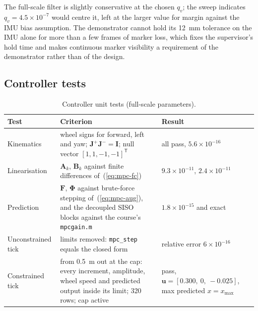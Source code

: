 \documentclass[11pt,a4paper]{article}
\newcommand{\vect}[1]{\bm{#1}}
\newcommand{\mat}[1]{\bm{#1}}
\newcommand{\T}{^{\mathsf{T}}}
\begin{document}
The full-scale filter is slightly conservative at the chosen $q_v$; the sweep indicates $q_v = 4.5\times10^{-7}$ would centre it, left at the larger value for margin against the IMU bias assumption. The demonstrator cannot hold its 12~mm tolerance on the IMU alone for more than a few frames of marker loss, which fixes the supervisor's hold time and makes continuous marker visibility a requirement of the demonstrator rather than of the design.

\subsection{Controller tests}
\begin{table}[H]
\centering\small
\caption{Controller unit tests (full-scale parameters).}
\label{tab:mpc-tests}
\begin{tabularx}{\linewidth}{>{\raggedright\arraybackslash}p{3.4cm} X >{\raggedright\arraybackslash}p{4.6cm}}
\toprule
Test & Criterion & Result \\
\midrule
Kinematics & wheel signs for forward, left and yaw; $\mat J^{+}\mat J^{-} = \mat I$; null vector $[1,1,-1,-1]\T$ & all pass, $5.6\times10^{-16}$ \\
Linearisation & $\mat A_k$, $\mat B_k$ against finite differences of~(\ref{eq:mpc-fc}) & $9.3\times10^{-11}$, $2.4\times10^{-11}$ \\
Prediction & $\mat F$, $\mat\Phi$ against brute-force stepping of~(\ref{eq:mpc-aug}), and the decoupled SISO blocks against the course's \texttt{mpcgain.m} & $1.8\times10^{-15}$ and exact \\
Unconstrained tick & limits removed: \texttt{mpc\_step} equals the closed form & relative error $6\times10^{-16}$ \\
Constrained tick & from 0.5~m out at the cap: every increment, amplitude, wheel speed and predicted output inside its limit; 320 rows; cap active & pass, $\vect u = [0.300,\ 0,\ -0.025]$, max predicted $x = x_{\max}$ \\
\bottomrule
\end{tabularx}
\end{table}
\end{document}
